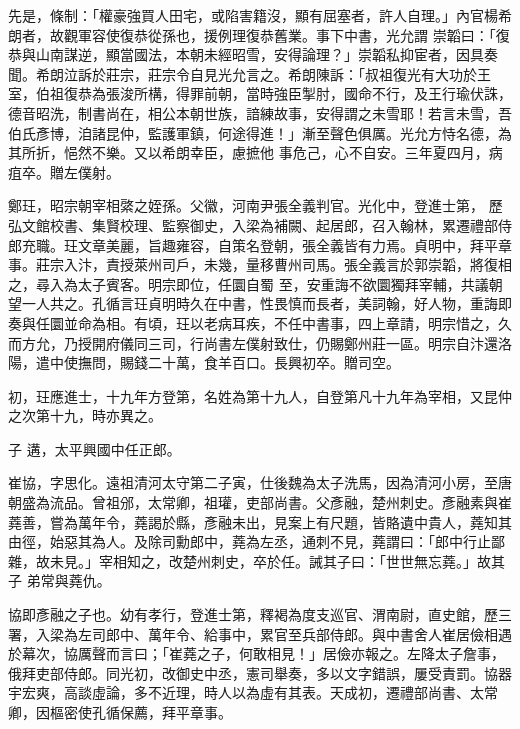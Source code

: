 \begin{pinyinscope}
 先是，條制：「權豪強買人田宅，或陷害籍沒，顯有屈塞者，許人自理。」內官楊希朗者，故觀軍容使復恭從孫也，援例理復恭舊業。事下中書，光允謂
 崇韜曰：「復恭與山南謀逆，顯當國法，本朝未經昭雪，安得論理？」崇韜私抑宦者，因具奏聞。希朗泣訴於莊宗，莊宗令自見光允言之。希朗陳訴：「叔祖復光有大功於王室，伯祖復恭為張浚所構，得罪前朝，當時強臣掣肘，國命不行，及王行瑜伏誅，德音昭洗，制書尚在，相公本朝世族，諳練故事，安得謂之未雪耶！若言未雪，吾伯氏彥博，洎諸昆仲，監護軍鎮，何途得進！」漸至聲色俱厲。光允方恃名德，為其所折，悒然不樂。又以希朗幸臣，慮摭他
 事危己，心不自安。三年夏四月，病疽卒。贈左僕射。


鄭玨，昭宗朝宰相綮之姪孫。父徽，河南尹張全義判官。光化中，登進士第，
 歷弘文館校書、集賢校理、監察御史，入梁為補闕、起居郎，召入翰林，累遷禮部侍郎充職。玨文章美麗，旨趣雍容，自策名登朝，張全義皆有力焉。貞明中，拜平章事。莊宗入汴，責授萊州司戶，未幾，量移曹州司馬。張全義言於郭崇韜，將復相之，尋入為太子賓客。明宗即位，任圜自蜀
 至，安重誨不欲圜獨拜宰輔，共議朝望一人共之。孔循言玨貞明時久在中書，性畏慎而長者，美詞翰，好人物，重誨即奏與任圜並命為相。有頃，玨以老病耳疾，不任中書事，四上章請，明宗惜之，久而方允，乃授開府儀同三司，行尚書左僕射致仕，仍賜鄭州莊一區。明宗自汴還洛陽，遣中使撫問，賜錢二十萬，食羊百口。長興初卒。贈司空。



 初，玨應進士，十九年方登第，名姓為第十九人，自登第凡十九年為宰相，又昆仲之次第十九，時亦異之。



 子
 遘，太平興國中任正郎。



 崔協，字思化。遠祖清河太守第二子寅，仕後魏為太子洗馬，因為清河小房，至唐朝盛為流品。曾祖邠，太常卿，祖瓘，吏部尚書。父彥融，楚州刺史。彥融素與崔蕘善，嘗為萬年令，蕘謁於縣，彥融未出，見案上有尺題，皆賂遺中貴人，蕘知其由徑，始惡其為人。及除司勳郎中，蕘為左丞，通刺不見，蕘謂曰：「郎中行止鄙雜，故未見。」宰相知之，改楚州刺史，卒於任。誡其子曰：「世世無忘蕘。」故其子
 弟常與蕘仇。



 協即彥融之子也。幼有孝行，登進士第，釋褐為度支巡官、渭南尉，直史館，歷三署，入梁為左司郎中、萬年令、給事中，累官至兵部侍郎。與中書舍人崔居儉相遇於幕次，協厲聲而言曰；「崔蕘之子，何敢相見！」居儉亦報之。左降太子詹事，俄拜吏部侍郎。同光初，改御史中丞，憲司舉奏，多以文字錯誤，屢受責罰。協器宇宏爽，高談虛論，多不近理，時人以為虛有其表。天成初，遷禮部尚書、太常卿，因樞密使孔循保薦，拜平章事。




\end{pinyinscope}
